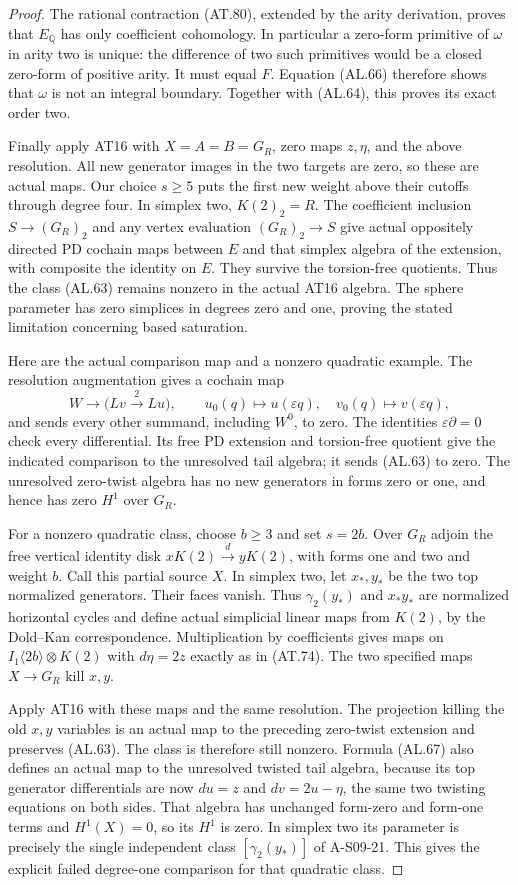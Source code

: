 \begin{proof}
The rational contraction (AT.80), extended by the
arity derivation, proves that $E_{\mathbb Q}$ has
only coefficient cohomology.  In particular a
zero-form primitive of $\omega$ in arity two is
unique: the difference of two such primitives
would be a closed zero-form of positive arity.
It must equal $F$.  Equation (AL.66) therefore
shows that $\omega$ is not an integral boundary.
Together with (AL.64), this proves its exact order two.

Finally apply AT16 with $X=A=B=G_R$, zero maps
$z,\eta$, and the above resolution.  All new
generator images in the two targets are zero,
so these are actual maps.  Our choice $s\geq5$
puts the first new weight above their cutoffs
through degree four.  In simplex two, $K(2)_2=R$.
The coefficient inclusion $S\to(G_R)_2$ and any
vertex evaluation $(G_R)_2\to S$ give actual
oppositely directed PD cochain maps between $E$
and that simplex algebra of the extension, with
composite the identity on $E$.
They survive the torsion-free quotients.
Thus the class (AL.63) remains nonzero in the
actual AT16 algebra.  The sphere parameter has
zero simplices in degrees zero and one, proving
the stated limitation concerning based saturation.

Here are the actual comparison map and a nonzero
quadratic example.  The resolution augmentation
gives a cochain map
\[
 W\longrightarrow
       \bigl(Lv\xrightarrow{\,2\,}Lu\bigr),
 \qquad
 u_0(q)\longmapsto u(\varepsilon q),\quad
 v_0(q)\longmapsto v(\varepsilon q),                 \tag{AL.67}
\]
and sends every other summand, including $W^0$, to
zero.  The identities $\varepsilon\partial=0$
check every differential.  Its free PD extension
and torsion-free quotient give the indicated
comparison to the unresolved tail algebra; it
sends (AL.63) to zero.  The unresolved zero-twist
algebra has no new generators in forms zero or
one, and hence has zero $H^1$ over $G_R$.

For a nonzero quadratic class, choose $b\geq3$
and set $s=2b$.  Over $G_R$ adjoin the free vertical
identity disk $xK(2)\xrightarrow{d}yK(2)$, with
forms one and two and weight $b$.  Call this
partial source $X$.  In simplex two, let $x_*,y_*$
be the two top normalized generators.
Their faces vanish.  Thus
$\gamma_2(y_*)$ and $x_*y_*$ are normalized
horizontal cycles and define actual simplicial
linear maps from $K(2)$, by the Dold--Kan
correspondence.  Multiplication by coefficients
gives maps on $I_1\langle2b\rangle\otimes K(2)$
with $d\eta=2z$ exactly as in (AT.74).
The two specified maps $X\to G_R$ kill $x,y$.

Apply AT16 with these maps and the same resolution.
The projection killing the old $x,y$ variables
is an actual map to the preceding zero-twist
extension and preserves (AL.63).  The class is
therefore still nonzero.  Formula (AL.67) also
defines an actual map to the unresolved twisted
tail algebra, because its top generator
differentials are now $du=z$ and $dv=2u-\eta$,
the same two twisting equations on both sides.
That algebra has unchanged form-zero and form-one
terms and $H^1(X)=0$, so its $H^1$ is zero.
In simplex two its parameter is precisely the
single independent class $[\gamma_2(y_*)]$ of
A-S09-21.  This gives the explicit failed
degree-one comparison for that quadratic class.
\end{proof}
